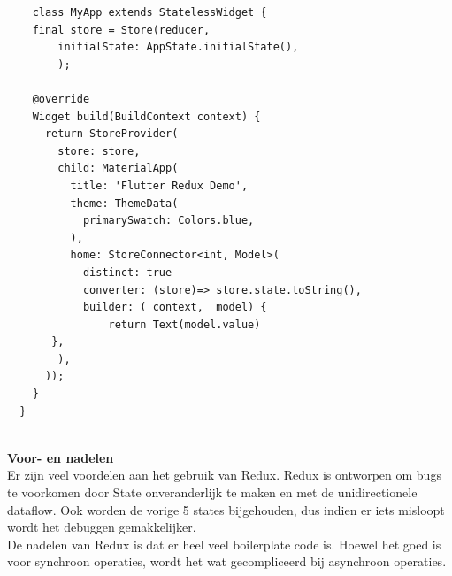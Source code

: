 \begin{verbatim}
    class MyApp extends StatelessWidget {
    final store = Store(reducer,
        initialState: AppState.initialState(),
        );

    @override
    Widget build(BuildContext context) {
      return StoreProvider(
        store: store,
        child: MaterialApp(
          title: 'Flutter Redux Demo',
          theme: ThemeData(
            primarySwatch: Colors.blue,
          ),
          home: StoreConnector<int, Model>(
            distinct: true
            converter: (store)=> store.state.toString(),
            builder: ( context,  model) {
                return Text(model.value)
       },
        ),
      ));
    }
  }
\end{verbatim}

\hfill
\\ 
\textbf{Voor- en nadelen}
\\
Er zijn veel voordelen aan het gebruik van Redux. Redux is ontworpen om bugs te voorkomen door State onveranderlijk te maken en met de unidirectionele dataflow. Ook worden de vorige 5 states bijgehouden, dus indien er iets misloopt wordt het debuggen gemakkelijker. 
\\
De nadelen van Redux is dat er heel veel boilerplate code is. Hoewel het goed is voor synchroon operaties, wordt het wat gecompliceerd bij asynchroon operaties. 
 


